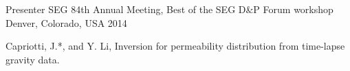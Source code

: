 \begin{cventries}
  \cventry
    {Presenter} %
    {SEG 84th Annual Meeting, Best of the SEG D\&P Forum workshop} %
    {Denver, Colorado, USA} %
    {2014} %
    {
      \begin{cvitems} %
        \item {Capriotti, J.*, and Y. Li, Inversion for permeability distribution from time-lapse gravity data.}
      \end{cvitems}
    }
    


\end{cventries}
